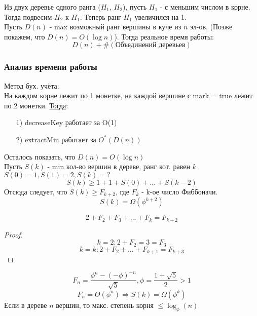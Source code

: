    Из двух деревье одного ранга ($H_1$, $H_2$), пусть $H_1$ - с меньшим числом в корне. Тогда подвесим $H_2$ к $H_1$. Теперь ранг $H_1$ увеличился на 1. \\

   Пусть $D(n)$ - max возможный ранг вершины в куче из $n$ эл-ов. (Позже покажем, что $D(n) = O(\log n)$). Тогда реальное время работы:
   \[
     D(n) + \#(\text{Объединений деревьев})
   \]

\subsubsection{Анализ времени работы}
Метод бух. учёта: \\

На каждом корне лежит по 1 монетке, на каждой вершине с mark = true лежит по 2 монетки. \underline{Тогда}:
\begin{itemize}
  \item [1) ] decreaseKey работает за O(1)
  \item [2) ] extractMin работает за $O^{*}(D(n))$
\end{itemize}
Осталось показать, что $D(n) = O(\log n)$ \\

Пусть $S(k)$ - min кол-во вершин в дереве, ранг кот. равен $k$ \\
$S(0) = 1, S(1) = 2, S(k) = ?$
\[
S(k) \geq 1 + 1 + S(0) + \ldots + S(k - 2)
\]
Отсюда следует, что $S(k) \geq F_{k + 2}$, где $F_k$ - k-ое число Фиббоначи.
\[
S(k) = \Omega(\phi^{k + 2})
\]
\begin{statement}
\[
  2 + F_2 + F_3 + \ldots + F_k = F_{k + 2}
\]
\end{statement}
\begin{proof}
\[
k = 2\colon 2 + F_2 = 3 = F_3
\]
\[
k = k\colon 2 + F_2 + \ldots + F_{k + 1} = F_{k + 3}
\]
\end{proof}
\[
F_n = \frac{\phi^{n} - (-\phi)^{-n}}{\sqrt{5}}, \phi = \frac{1 + \sqrt{5}}{2} > 1
\]
\[
F_n = \Theta(\phi^{n}) \Rightarrow S(k) = \Omega(\phi^{k})
\]
Если в дереве $n$ вершин, то макс. степень корня $\leq \log_{\phi}(n)$
